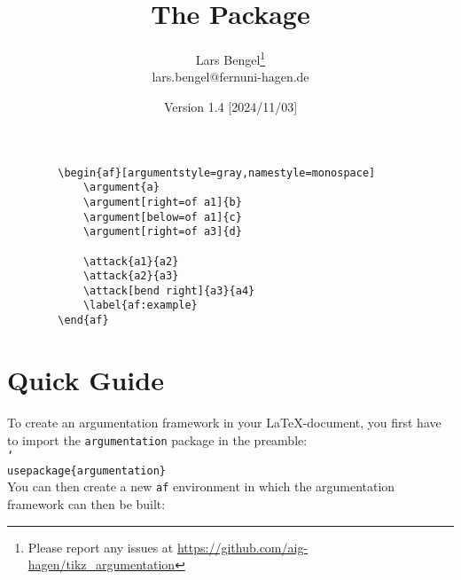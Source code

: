 \documentclass{scrartcl}
\title{The \argumentation Package}
\author{Lars Bengel\footnote{Please report any issues at \url{https://github.com/aig-hagen/tikz_argumentation}}\\\small lars.bengel@fernuni-hagen.de}
\date{Version 1.4 [2024/11/03]}
\newcommand{\argumentation}{\texttt{argumentation}\xspace}
\DeclareRobustCommand\cs[2][-1.6cm]{\hspace{#1}\texttt{\char`\\#2}}
\begin{document}
\maketitle

\begin{minipage}{.26\textwidth}
    \centering
        \begin{af}[argumentstyle=gray,namestyle=monospace]
    
            \label{af:example}
        \end{af}
\end{minipage}
\begin{minipage}{.5\textwidth}
    \begin{small}
    \begin{verbatim}
        \begin{af}[argumentstyle=gray,namestyle=monospace]
            \argument{a}
            \argument[right=of a1]{b}
            \argument[below=of a1]{c}
            \argument[right=of a3]{d}
    
            \attack{a1}{a2}
            \attack{a2}{a3}
            \attack[bend right]{a3}{a4}
            \label{af:example}
        \end{af}
    \end{verbatim}
    \end{small}
\end{minipage}


\tableofcontents
\newpage

\section{Quick Guide}\label{sec:quick}
\noindent
To create an argumentation framework in your \LaTeX-document, you first have to import the \argumentation package in the preamble:\\

\noindent\cs[0cm]{usepackage\{argumentation\}}\\

You can then create a new \texttt{af} environment in which the argumentation framework can then be built:\\
\end{document}
